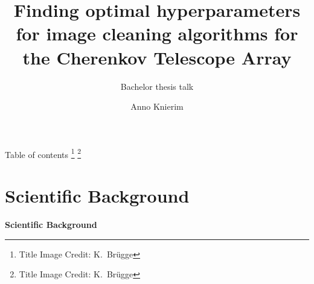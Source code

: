 
 {}
 {\def\theme{-1}}

  {%
  }
  {%
  }



\title{Finding optimal hyperparameters for image cleaning algorithms for the Cherenkov Telescope Array}
\subtitle{Bachelor thesis talk}
\author[A.~Knierim]{Anno Knierim} %




\maketitle

\begin{frame}[label=title]{Table of contents}
  \tableofcontents
  \vfill
  {%
  \footnote{\textcolor{white!85!black}{Title Image Credit: K.~Br\"{u}gge}}
  }
  {%
  \footnote{\textcolor{darkgray!85!black}{Title Image Credit: K.~Br\"{u}gge}}
  }
\end{frame}


\section{Scientific Background}%
\label{sec:introduction}

\begin{frame}
  \begin{center}
    \textbf{\huge Scientific Background}\\
  \end{center}
\end{frame}



